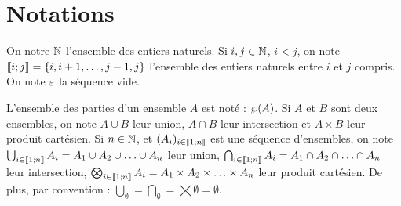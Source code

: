 \section{Notations}

On notre $\mathbb{N}$ l'ensemble des entiers naturels.
Si $i, j \in \mathbb{N}$, $i < j$, on note $\llbracket i; j \rrbracket = \{ i, i+1, \ldots, j-1, j \}$
l'ensemble des entiers naturels entre $i$ et $j$ compris.
On note $\varepsilon$ la séquence vide.

L'ensemble des parties d'un ensemble $A$ est noté : $\wp(A)$.
Si $A$ et $B$ sont deux ensembles, on note
$A \cup B$ leur union, $A \cap B$ leur intersection et $A \times B$ leur produit cartésien.
Si $n \in \mathbb{N}$, et $(A_i)_{i \in \llbracket 1; n \rrbracket}$ est une séquence d'ensembles, on note
$\bigcup_{i \in \llbracket 1; n \rrbracket} A_i = A_1 \cup A_2 \cup \ldots \cup A_n$ leur union,
$\bigcap_{i \in \llbracket 1; n \rrbracket} A_i = A_1 \cap A_2 \cap \ldots \cap A_n$ leur intersection,
$\bigotimes_{i \in \llbracket 1; n \rrbracket} A_i = A_1 \times A_2 \times \ldots \times A_n$ leur produit cartésien.
De plus, par convention :
$\bigcup_{\emptyset} = \bigcap_{\emptyset} = \bigtimes{\emptyset} = \emptyset$.


